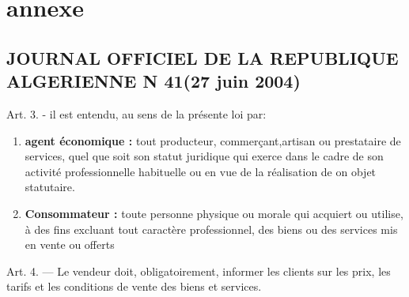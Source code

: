 \documentclass[edit,12pt,a4paper,ChapStyle,oneside,doubleinterligne]{report}
\begin{document}
\chapter*{annexe}
\section*{JOURNAL OFFICIEL DE LA  REPUBLIQUE ALGERIENNE N 41(27 juin 2004)}
Art. 3. - il est entendu, au sens de la présente loi par:
\begin{enumerate}
    \item \textbf{agent économique :} tout producteur, commerçant,artisan ou prestataire de services, quel que soit son statut juridique qui exerce dans le cadre de son activité professionnelle habituelle ou en vue de la réalisation de on objet statutaire.
    \item \textbf{Consommateur :} toute personne physique ou morale qui acquiert ou utilise, à des fins excluant tout caractère professionnel, des biens ou des services mis en vente ou offerts
\end{enumerate}
Art. 4. — Le vendeur doit, obligatoirement, informer les clients sur les prix, les tarifs et les conditions de vente des biens et services\cite{journal41}.
\end{document}
